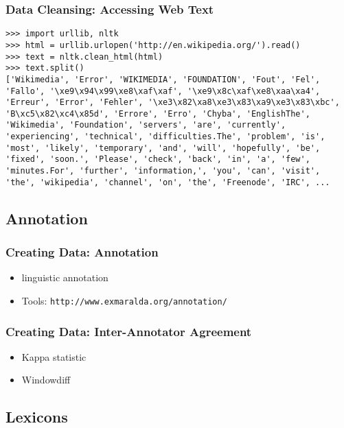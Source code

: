 \documentclass{beamer}             %
\begin{document}
\begin{frame}[fragile]
\frametitle{Data Cleansing: Accessing Web Text}

\scriptsize
\begin{verbatim}
>>> import urllib, nltk
>>> html = urllib.urlopen('http://en.wikipedia.org/').read()
>>> text = nltk.clean_html(html)
>>> text.split()
['Wikimedia', 'Error', 'WIKIMEDIA', 'FOUNDATION', 'Fout', 'Fel',
'Fallo', '\xe9\x94\x99\xe8\xaf\xaf', '\xe9\x8c\xaf\xe8\xaa\xa4',
'Erreur', 'Error', 'Fehler', '\xe3\x82\xa8\xe3\x83\xa9\xe3\x83\xbc',
'B\xc5\x82\xc4\x85d', 'Errore', 'Erro', 'Chyba', 'EnglishThe',
'Wikimedia', 'Foundation', 'servers', 'are', 'currently',
'experiencing', 'technical', 'difficulties.The', 'problem', 'is',
'most', 'likely', 'temporary', 'and', 'will', 'hopefully', 'be',
'fixed', 'soon.', 'Please', 'check', 'back', 'in', 'a', 'few',
'minutes.For', 'further', 'information,', 'you', 'can', 'visit',
'the', 'wikipedia', 'channel', 'on', 'the', 'Freenode', 'IRC', ...
\end{verbatim}
\end{frame}

\subsection{Annotation}

\begin{frame}[fragile]
\frametitle{Creating Data: Annotation}

\begin{itemize}
\item linguistic annotation
\item Tools: \verb|http://www.exmaralda.org/annotation/|
\end{itemize}
\end{frame}

\begin{frame}[fragile]
\frametitle{Creating Data: Inter-Annotator Agreement}
  \begin{itemize}
  \item Kappa statistic
  \item Windowdiff
  \end{itemize}
\end{frame}

\subsection{Lexicons}
\end{document}
